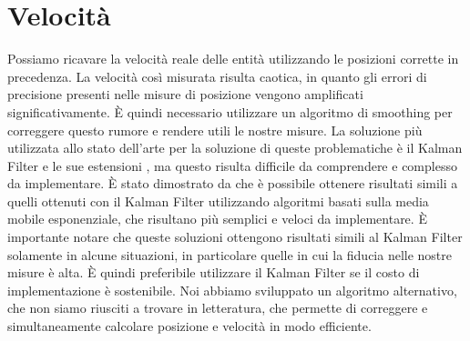 \section{Velocità}
\label{sec:funzionalita-velocita}
Possiamo ricavare la velocità reale delle entità utilizzando le posizioni corrette in precedenza.
La velocità così misurata risulta caotica, in quanto gli errori di precisione presenti nelle misure di posizione vengono amplificati significativamente.
È quindi necessario utilizzare un algoritmo di smoothing per correggere questo rumore e rendere utili le nostre misure.
La soluzione più utilizzata allo stato dell'arte per la soluzione di queste problematiche è il Kalman Filter e le sue estensioni \cite{kalman}, ma questo risulta difficile da comprendere e complesso da implementare.
È stato dimostrato da \cite{laviola} che è possibile ottenere risultati simili a quelli ottenuti con il Kalman Filter utilizzando algoritmi basati sulla media mobile esponenziale, che risultano più semplici e veloci da implementare.
È importante notare che queste soluzioni ottengono risultati simili al Kalman Filter solamente in alcune situazioni, in particolare quelle in cui la fiducia nelle nostre misure è alta.
È quindi preferibile utilizzare il Kalman Filter se il costo di implementazione è sostenibile.
Noi abbiamo sviluppato un algoritmo alternativo, che non siamo riusciti a trovare in letteratura, che permette di correggere e simultaneamente calcolare posizione e velocità in modo efficiente.
